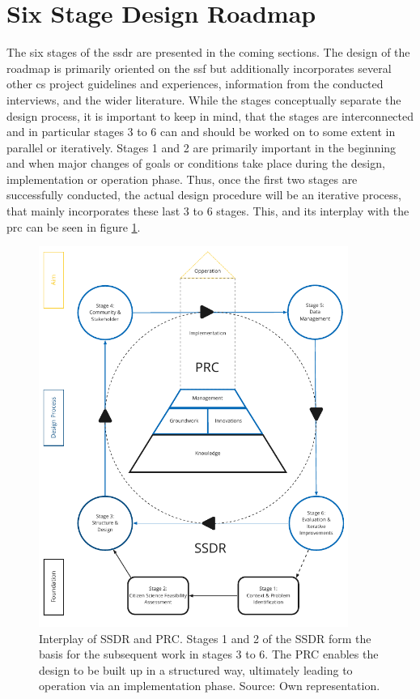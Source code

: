 \section{Six Stage Design Roadmap}\label{sec:ssdr}
The six stages of the \acrshort{ssdr} are presented in the coming sections. The design of the roadmap is primarily oriented on the \acrshort{ssf} but additionally incorporates several other \acrshort{cs} project guidelines and experiences, information from the conducted interviews, and the wider literature. While the stages conceptually separate the design process, it is important to keep in mind, that the stages are interconnected and in particular stages 3 to 6 can and should be worked on to some extent in parallel or iteratively. Stages 1 and 2 are primarily important in the beginning and when major changes of goals or conditions take place during the design, implementation or operation phase. Thus, once the first two stages are successfully conducted, the actual design procedure will be an iterative process, that mainly incorporates these last 3 to 6 stages. This, and its interplay with the \acrshort{prc} can be seen in figure \ref{fig:res_ssdr_prc}.

\begin{figure}[!htp]
    \centering
    \includegraphics[width=0.9\textwidth]{figures/2023_MA_results_ssdr_prc.pdf}
    \decoRule
    \caption[Interplay of SSDR and PRC]{Interplay of SSDR and PRC. Stages 1 and 2 of the SSDR form the basis for the subsequent work in stages 3 to 6. The PRC enables the design to be built up in a structured way, ultimately leading to operation via an implementation phase. Source: Own representation.}
    \label{fig:res_ssdr_prc}
\end{figure}

